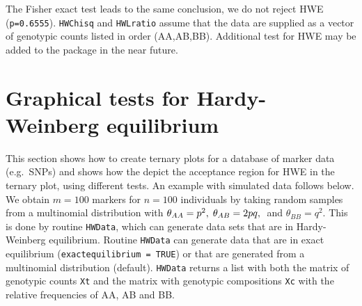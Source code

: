 \documentclass[a4paper]{article}
\begin{document}
The Fisher exact test leads to the same conclusion, we do not reject HWE ({\tt p=0.6555}).
{\tt HWChisq} and {\tt HWLratio} assume that the data are supplied as a vector of genotypic 
counts listed in order (AA,AB,BB). Additional test for HWE may be added to the package in the near future.

\section{Graphical tests for Hardy-Weinberg equilibrium}
\label{sec:graphical}

This section shows how to create ternary plots for a database of marker data (e.g.\ SNPs) and shows
how the depict the acceptance region for HWE in the ternary plot, using different tests. 
An example with simulated data follows below. We obtain $m=100$ markers for $n=100$ individuals
by taking random samples from a multinomial distribution with $\theta_{AA} = p^2, \hspace{1mm} \theta_{AB} = 2pq, 
\hspace{1mm}$ and $\theta_{BB} = q^2$. This is done by routine {\tt HWData}, which can generate data sets
that are in Hardy-Weinberg equilibrium. Routine {\tt HWData} can generate data that are in exact
equilibrium ({\tt exactequilibrium = TRUE}) or that are generated from a multinomial distribution (default).
{\tt HWData} returns a list with both the matrix of genotypic counts {\tt Xt} and the matrix with genotypic 
compositions {\tt Xc} with the relative frequencies of AA, AB and BB.

\begin{Schunk}
\end{Schunk}
\end{document}
